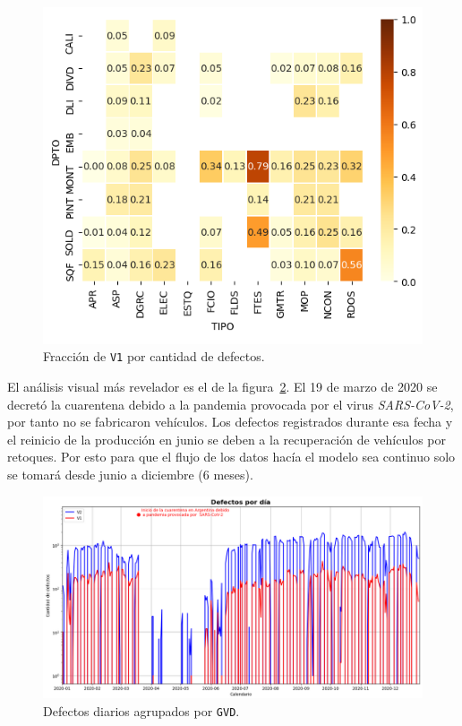 \documentclass[a4paper,12pt]{article}
\begin{document}
\begin{figure}[H]
	\begin{center}
	\includegraphics[width=1\textwidth]{tesis_58.png}
  	\caption{Fracción de \texttt{V1} por cantidad de defectos.}
  	\label{fig:heatmapfractionv1}
  	\end{center}
\end{figure}

El análisis visual más revelador es el de la figura~\ref{fig:defectsperday}. El 19 de marzo de 2020 se decretó la cuarentena debido a la pandemia provocada por el virus \textit{SARS-CoV-2}, por tanto no se fabricaron vehículos. Los defectos registrados durante esa fecha y el reinicio de la producción en junio se deben a la recuperación de vehículos por retoques. Por esto para que el flujo de los datos hacía el modelo sea continuo solo se tomará desde junio a diciembre (6 meses).

\begin{figure}[H]
	\begin{center}
	\includegraphics[width=1\textwidth]{tesis_64.png}
  	\caption{Defectos diarios agrupados por \texttt{GVD}.}
  	\label{fig:defectsperday}
  	\end{center}
\end{figure}
\end{document}
